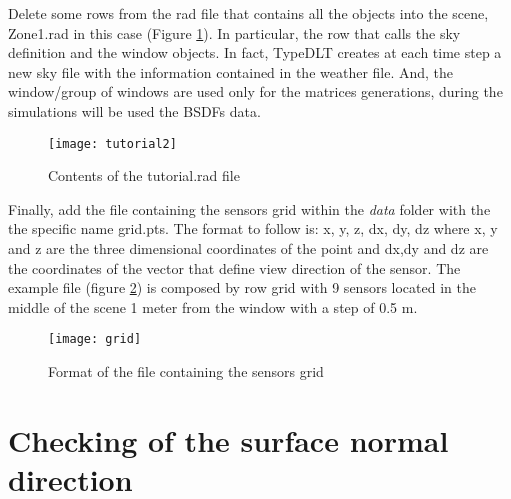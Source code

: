 Delete some rows from the rad file that contains all the objects into the scene, Zone1.rad in this case (Figure \ref{img4:tutorial2}). In particular, the row that calls the sky definition and the window objects. In fact, TypeDLT creates at each time step a new sky file with the information contained in the weather file. And, the window/group of windows are used only for the matrices generations, during the simulations will be used the BSDFs data.

\begin{figure}[h]
\centering
\texttt{[image: tutorial2]}
\caption{\label{img4:tutorial2} Contents of the tutorial.rad file}
\end{figure}

Finally, add the file containing the sensors grid within the \textit{data} folder with the the specific name {\color{blue}grid.pts}. The format to follow is: x, y, z, dx, dy, dz where x, y and z are the three dimensional coordinates of the point and dx,dy and dz are the coordinates of the vector that define view direction of the sensor.
The example file (figure \ref{img4:grid}) is composed by row grid with 9 sensors located in the middle of the scene 1 meter from the window with a step of 0.5 m.

\begin{figure}[h]
\centering
\texttt{[image: grid]}
\caption{\label{img4:grid} Format of the file containing the sensors grid}
\end{figure}

\section{Checking of the surface normal direction} \label{sec:normalsurf}

